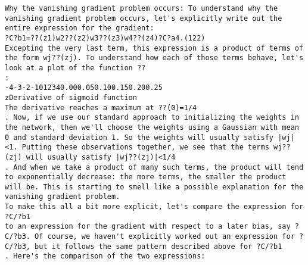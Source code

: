 \begin{lstlisting}
Why the vanishing gradient problem occurs: To understand why the vanishing gradient problem occurs, let's explicitly write out the entire expression for the gradient: 
?C?b1=??(z1)w2??(z2)w3??(z3)w4??(z4)?C?a4.(122)
Excepting the very last term, this expression is a product of terms of the form wj??(zj). To understand how each of those terms behave, let's look at a plot of the function ??
: 
-4-3-2-1012340.000.050.100.150.200.25
zDerivative of sigmoid function
The derivative reaches a maximum at ??(0)=1/4
. Now, if we use our standard approach to initializing the weights in the network, then we'll choose the weights using a Gaussian with mean 0 and standard deviation 1. So the weights will usually satisfy |wj|<1. Putting these observations together, we see that the terms wj??(zj) will usually satisfy |wj??(zj)|<1/4
. And when we take a product of many such terms, the product will tend to exponentially decrease: the more terms, the smaller the product will be. This is starting to smell like a possible explanation for the vanishing gradient problem.
To make this all a bit more explicit, let's compare the expression for ?C/?b1
to an expression for the gradient with respect to a later bias, say ?C/?b3. Of course, we haven't explicitly worked out an expression for ?C/?b3, but it follows the same pattern described above for ?C/?b1
. Here's the comparison of the two expressions: 


\end{lstlisting}
